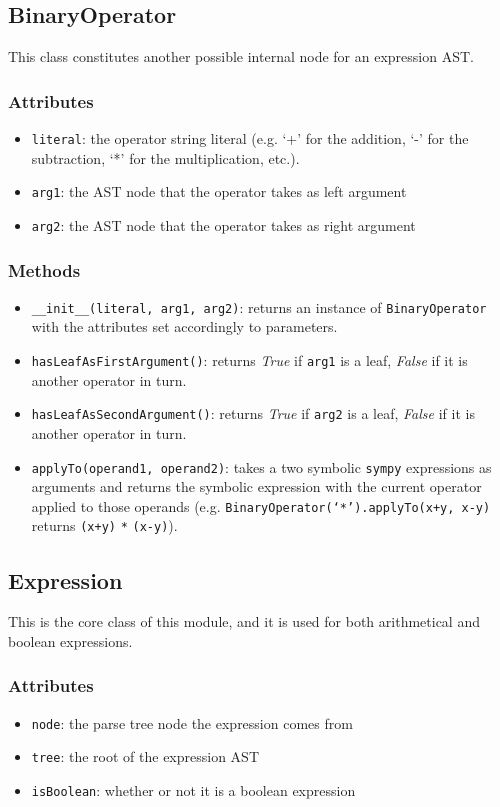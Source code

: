 \documentclass[12pt,a4paper]{report}
\theoremstyle{definition}
\theoremstyle{definition}
\theoremstyle{definition}
\begin{document}
\subsection{BinaryOperator}
This class constitutes another possible internal node for an expression AST.
\subsubsection{Attributes}
\begin{itemize}
    \itemsep 0em
    \item \texttt{literal}: the operator string literal (e.g. `+' for the addition, `-' for the subtraction, `*' for the multiplication, etc.).
    \item \texttt{arg1}: the AST node that the operator takes as left argument
    \item \texttt{arg2}: the AST node that the operator takes as right argument
\end{itemize}
\subsubsection{Methods}
\begin{itemize}
    \itemsep 0em
    \item \texttt{\_\_init\_\_(literal, arg1, arg2)}: returns an instance of \texttt{BinaryOperator} with the attributes set accordingly to parameters.
    \item \texttt{hasLeafAsFirstArgument()}: returns \textit{True} if \texttt{arg1} is a leaf, \textit{False} if it is another operator in turn.
    \item \texttt{hasLeafAsSecondArgument()}: returns \textit{True} if \texttt{arg2} is a leaf, \textit{False} if it is another operator in turn.
    \item \texttt{applyTo(operand1, operand2)}: takes a two symbolic \texttt{sympy} expressions as arguments and returns the symbolic expression with the current operator applied to those operands (e.g. \texttt{BinaryOperator(`*').applyTo(x+y, x-y)} returns \texttt{(x+y)} \texttt{*} \texttt{(x-y)}).
\end{itemize}

\subsection{Expression}
This is the core class of this module, and it is used for both arithmetical and boolean expressions.
\subsubsection{Attributes}
\begin{itemize}
    \itemsep 0em
    \item \texttt{node}: the parse tree node the expression comes from
    \item \texttt{tree}: the root of the expression AST
    \item \texttt{isBoolean}: whether or not it is a boolean expression
\end{itemize}
\end{document}
